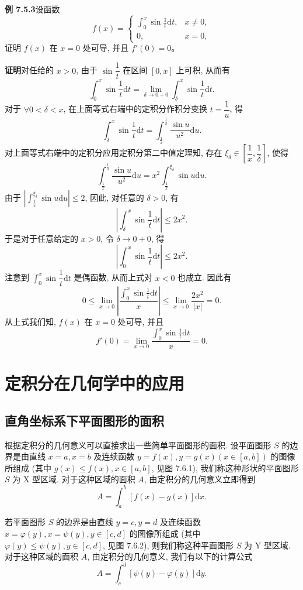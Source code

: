 \documentclass[UTF8,12pt,a4paper,fontset=fandol]{ctexart}
\begin{document}
\noindent\textbf{例 7.5.3}\quad 设函数
\[
  f(x)=
  \begin{cases}
    \displaystyle\int_0^x \sin\frac{1}{t}\mathrm dt, & x\neq0,\\
    0, & x=0,
  \end{cases}
\]
证明 $f(x)$ 在 $x=0$ 处可导, 并且 $f'(0)=0$。

\noindent\textbf{证明}\quad 对任给的 $x>0$, 由于 $\sin\dfrac{1}{t}$ 在区间 $[0,x]$ 上可积, 从而有
\[
  \int_0^x \sin\frac{1}{t}\mathrm dt=\lim_{\delta\to0+0}\int_\delta^x \sin\frac{1}{t}\mathrm dt.
\]
对于 $\forall 0<\delta<x$, 在上面等式右端中的定积分作积分变换 $t=\dfrac{1}{u}$, 得
\[
  \int_\delta^x \sin\frac{1}{t}\mathrm dt
  =\int_{\frac{1}{x}}^{\frac{1}{\delta}}\frac{\sin u}{u^2}\mathrm du.
\]
对上面等式右端中的定积分应用定积分第二中值定理知, 存在 $\xi_\delta\in\left[\dfrac{1}{x},\dfrac{1}{\delta}\right]$, 使得
\[
  \int_{\frac{1}{x}}^{\frac{1}{\delta}}\frac{\sin u}{u^2}\mathrm du
  =x^2\int_{\frac{1}{x}}^{\xi_\delta}\sin u\mathrm du.
\]
由于 $\left|\int_{\frac{1}{x}}^{\xi_\delta}\sin u\mathrm du\right|\leq2$, 因此, 对任意的 $\delta>0$, 有
\[
  \left|\int_\delta^x \sin\frac{1}{t}\mathrm dt\right|\leq2x^2.
\]
于是对于任意给定的 $x>0$, 令 $\delta\to0+0$, 得
\[
  \left|\int_0^x \sin\frac{1}{t}\mathrm dt\right|\leq2x^2.
\]
注意到 $\int_0^x\sin\dfrac{1}{t}\mathrm dt$ 是偶函数, 从而上式对 $x<0$ 也成立. 因此有
\[
  0\leq\lim_{x\to0}\left|\frac{\int_0^x\sin\frac{1}{t}\mathrm dt}{x}\right|
  \leq\lim_{x\to0}\frac{2x^2}{|x|}=0.
\]
从上式我们知, $f(x)$ 在 $x=0$ 处可导, 并且
\[
  f'(0)=\lim_{x\to0}\frac{\int_0^x\sin\frac{1}{t}\mathrm dt}{x}=0.
\]

\section{定积分在几何学中的应用}

\subsection{直角坐标系下平面图形的面积}

根据定积分的几何意义可以直接求出一些简单平面图形的面积. 设平面图形 $S$ 的边界是由直线 $x=a,x=b$ 及连续函数 $y=f(x),y=g(x)(x\in[a,b])$ 的图像所组成 (其中 $g(x)\leq f(x),x\in[a,b]$, 见图 7.6.1), 我们称这种形状的平面图形 $S$ 为 X 型区域. 对于这种区域的面积 $A$, 由定积分的几何意义立即得到
\[
  A=\int_a^b [f(x)-g(x)]\mathrm dx.
\]

若平面图形 $S$ 的边界是由直线 $y=c,y=d$ 及连续函数 $x=\varphi(y),x=\psi(y),y\in[c,d]$ 的图像所组成 (其中 $\varphi(y)\leq\psi(y),y\in[c,d]$, 见图 7.6.2), 则我们称这种平面图形 $S$ 为 Y 型区域. 对于这种区域的面积 $A$, 由定积分的几何意义, 我们有以下的计算公式
\[
  A=\int_c^d [\psi(y)-\varphi(y)]\mathrm dy.
\]
\end{document}
